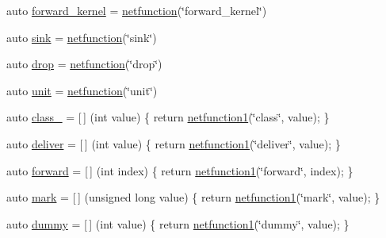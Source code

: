 \begin{DoxyCompactItemize}
\item 
auto \hyperlink{namespacepfq__lang_1_1anonymous__namespace_02default_8hpp_03_a453450a8ebf5660ab590a3ffb79057e1}{forward\+\_\+kernel} = \hyperlink{namespacepfq__lang_a9f546a4602872df5ca74050ecb68a6b3}{netfunction}(\char`\"{}forward\+\_\+kernel\char`\"{})
\item 
auto \hyperlink{namespacepfq__lang_1_1anonymous__namespace_02default_8hpp_03_ad708862e729d0cc6a217d86bb25b1061}{sink} = \hyperlink{namespacepfq__lang_a9f546a4602872df5ca74050ecb68a6b3}{netfunction}(\char`\"{}sink\char`\"{})
\item 
auto \hyperlink{namespacepfq__lang_1_1anonymous__namespace_02default_8hpp_03_abed0412f2864624f755594077d255b1e}{drop} = \hyperlink{namespacepfq__lang_a9f546a4602872df5ca74050ecb68a6b3}{netfunction}(\char`\"{}drop\char`\"{})
\item 
auto \hyperlink{namespacepfq__lang_1_1anonymous__namespace_02default_8hpp_03_ae78caafebdc64f9180032a049b7c3b3a}{unit} = \hyperlink{namespacepfq__lang_a9f546a4602872df5ca74050ecb68a6b3}{netfunction}(\char`\"{}unit\char`\"{})
\item 
auto \hyperlink{namespacepfq__lang_1_1anonymous__namespace_02default_8hpp_03_a27a683ef93570a66844e1a0106e6336a}{class\+\_\+} = \mbox{[}$\,$\mbox{]} (int value) \{ return \hyperlink{namespacepfq__lang_af215f25fa7ebd61fdc90cf0ef78a3164}{netfunction1}(\char`\"{}class\char`\"{}, value); \}
\item 
auto \hyperlink{namespacepfq__lang_1_1anonymous__namespace_02default_8hpp_03_a9baf04657b3da63a2a6d574bbcdafb76}{deliver} = \mbox{[}$\,$\mbox{]} (int value) \{ return \hyperlink{namespacepfq__lang_af215f25fa7ebd61fdc90cf0ef78a3164}{netfunction1}(\char`\"{}deliver\char`\"{}, value); \}
\item 
auto \hyperlink{namespacepfq__lang_1_1anonymous__namespace_02default_8hpp_03_a7fbe4b2614dd240727bf1696b4d06523}{forward} = \mbox{[}$\,$\mbox{]} (int index) \{ return \hyperlink{namespacepfq__lang_af215f25fa7ebd61fdc90cf0ef78a3164}{netfunction1}(\char`\"{}forward\char`\"{}, index); \}
\item 
auto \hyperlink{namespacepfq__lang_1_1anonymous__namespace_02default_8hpp_03_ad6142fe3a0fc859f25ea16956f52a5f0}{mark} = \mbox{[}$\,$\mbox{]} (unsigned long value) \{ return \hyperlink{namespacepfq__lang_af215f25fa7ebd61fdc90cf0ef78a3164}{netfunction1}(\char`\"{}mark\char`\"{}, value); \}
\item 
auto \hyperlink{namespacepfq__lang_1_1anonymous__namespace_02default_8hpp_03_a876b4be1c6cf97e317f74242d8fb3da4}{dummy} = \mbox{[}$\,$\mbox{]} (int value) \{ return \hyperlink{namespacepfq__lang_af215f25fa7ebd61fdc90cf0ef78a3164}{netfunction1}(\char`\"{}dummy\char`\"{}, value); \}

\end{DoxyCompactItemize}
